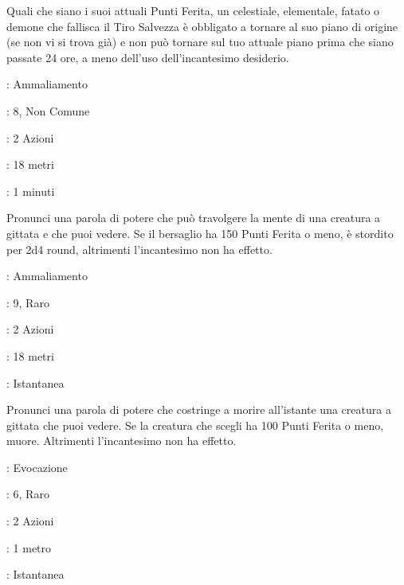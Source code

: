 \begin{multicols}{2}
Quali che siano i suoi attuali Punti Ferita, un celestiale, elementale, fatato o demone che fallisca il Tiro Salvezza è obbligato a tornare al suo piano di origine (se non vi si trova già) e non può tornare sul tuo attuale piano prima che siano passate 24 ore, a meno dell'uso dell'incantesimo desiderio.

\noindent\colorbox{OBSSgold!10}{
\begin{minipage}{0.95\linewidth}
\begin{description}[noitemsep, topsep=0pt, parsep=0pt, partopsep=0pt, leftmargin=0cm, labelwidth=1.3cm]
	\item[\textbf{Lista}]: Ammaliamento
	\item[\textbf{Livello}]: 8, Non Comune
	\item[\textbf{Lancio}]: 2 Azioni
	\item[\textbf{Gittata}]: 18 metri
	\item[\textbf{Durata}]: 1 minuti
\end{description}
\end{minipage}}\smallskip

Pronunci una parola di potere che può travolgere la mente di una creatura a gittata e che puoi vedere. Se il bersaglio ha 150 Punti Ferita o meno, è stordito per 2d4 round, altrimenti l'incantesimo non ha effetto.

\noindent\colorbox{OBSSgold!10}{
\begin{minipage}{0.95\linewidth}
\begin{description}[noitemsep, topsep=0pt, parsep=0pt, partopsep=0pt, leftmargin=0cm, labelwidth=1.3cm]
	\item[\textbf{Lista}]: Ammaliamento
	\item[\textbf{Livello}]: 9, Raro
	\item[\textbf{Lancio}]: 2 Azioni
	\item[\textbf{Gittata}]: 18 metri
	\item[\textbf{Durata}]: Istantanea
\end{description}
\end{minipage}}\smallskip

Pronunci una parola di potere che costringe a morire all'istante una creatura a gittata che puoi vedere. Se la creatura che scegli ha 100 Punti Ferita o meno, muore. Altrimenti l'incantesimo non ha effetto.

\noindent\colorbox{OBSSgold!10}{
\begin{minipage}{0.95\linewidth}
\begin{description}[noitemsep, topsep=0pt, parsep=0pt, partopsep=0pt, leftmargin=0cm, labelwidth=1.3cm]
	\item[\textbf{Lista}]: Evocazione
	\item[\textbf{Livello}]: 6, Raro
	\item[\textbf{Lancio}]: 2 Azioni
	\item[\textbf{Gittata}]: 1 metro
	\item[\textbf{Durata}]: Istantanea
\end{description}
\end{minipage}}\smallskip


\end{multicols}

